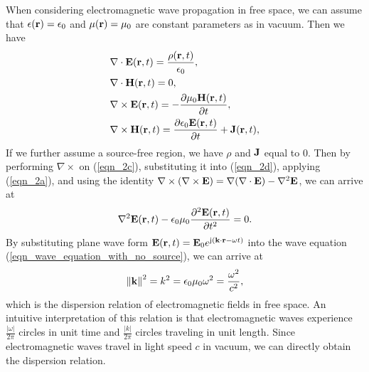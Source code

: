 \documentclass[12pt,draftclsnofoot,journal,onecolumn]{IEEEtran}
\begin{document}
{When considering electromagnetic wave propagation in free space, we can assume that $\epsilon({\bf r}) = \epsilon_0$ and $\mu({\bf r}) = \mu_0$ are constant parameters as in vacuum. Then we have
\begin{subequations}
	\begin{align} 
		& \nabla \cdot  {\bf E}({\bf r},t) = \frac{\rho({\bf r},t)}{\epsilon_0}, \label{eqn_2a}\\
		& \nabla \cdot {\bf H}({\bf r},t) = 0,\\
		&\nabla \times {\bf E}({\bf r},t) = -\frac{\partial \mu_0 {\bf H}({\bf r},t)}{\partial t}, \label{eqn_2c}\\
		& \nabla \times {\bf H}({\bf r},t) = \frac{ \partial \epsilon_0 {\bf E}({\bf r},t)}{\partial t}+{\bf J}({\bf r},t) \label{eqn_2d}, 
	\end{align}
	\label{eqn_2}
\end{subequations}
If we further assume a source-free region, we have $\rho$ and ${\bf J}$ equal to 0. Then by performing $\nabla\times $ on (\ref{eqn_2c}), substituting it into (\ref{eqn_2d}), applying (\ref{eqn_2a}), and using the identity $\nabla\times(\nabla\times {\bf E}) = \nabla(\nabla\cdot {\bf E})-\nabla^2 {\bf E}$, we can arrive at
\begin{equation}
	\begin{aligned}
		\nabla^2 {\bf E}({\bf r},t) - \epsilon_0 \mu_0 \frac{\partial^2 {\bf E}({\bf r},t)}{\partial t^2} = 0. 
	\end{aligned}
	\label{eqn_wave_equation_with_no_source}
\end{equation}
By substituting plane wave form ${\bf E}({\bf r},t) = {\bf E}_0 e^{{\rm j}({\bf k}\cdot {\bf r}-\omega t)}$ into the wave equation (\ref{eqn_wave_equation_with_no_source}), we can arrive at
\begin{equation}
	\left\|  {\bf k} \right\|^2 = k^2 = \epsilon_0 \mu_0 \omega^2 = \frac{\omega^2}{c^2},
	\label{eqn_dispersion_relation}
\end{equation}
which is the dispersion relation of electromagnetic fields in free space. An intuitive interpretation of this relation is that electromagnetic waves experience $\frac{|\omega|}{2\pi}$ circles in unit time and $\frac{|k|}{2\pi}$ circles traveling in unit length. Since electromagnetic waves travel in light speed $c$ in vacuum, we can directly obtain the dispersion relation.

}
\end{document}

